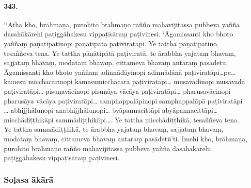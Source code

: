 \paragraph{343.} ‘‘Atha kho, brāhmaṇa, purohito brāhmaṇo rañño mahāvijitassa pubbeva yaññā dasahākārehi paṭiggāhakesu vippaṭisāraṃ paṭivinesi. ‘Āgamissanti kho bhoto yaññaṃ pāṇātipātinopi pāṇātipātā paṭiviratāpi. Ye tattha pāṇātipātino, tesaññeva tena. Ye tattha pāṇātipātā paṭiviratā, te ārabbha yajataṃ bhavaṃ, sajjataṃ bhavaṃ, modataṃ bhavaṃ, cittameva bhavaṃ antaraṃ pasādetu. Āgamissanti kho bhoto yaññaṃ adinnādāyinopi adinnādānā paṭiviratāpi…pe… kāmesu micchācārinopi kāmesumicchācārā paṭiviratāpi… musāvādinopi musāvādā paṭiviratāpi… pisuṇavācinopi pisuṇāya vācāya paṭiviratāpi… pharusavācinopi pharusāya vācāya paṭiviratāpi… samphappalāpinopi samphappalāpā paṭiviratāpi … abhijjhālunopi anabhijjhālunopi… byāpannacittāpi abyāpannacittāpi… micchādiṭṭhikāpi sammādiṭṭhikāpi…. Ye tattha micchādiṭṭhikā, tesaññeva tena. Ye tattha sammādiṭṭhikā, te ārabbha yajataṃ bhavaṃ, sajjataṃ bhavaṃ, modataṃ bhavaṃ, cittameva bhavaṃ antaraṃ pasādetū’ti. Imehi kho, brāhmaṇa, purohito brāhmaṇo rañño mahāvijitassa pubbeva yaññā dasahākārehi paṭiggāhakesu vippaṭisāraṃ paṭivinesi.

\subsubsection{Soḷasa ākārā}

